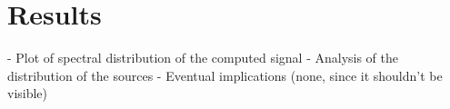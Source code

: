 \chapter{Results}
- Plot of spectral distribution of the computed signal
- Analysis of the distribution of the sources
- Eventual implications (none, since it shouldn't be visible)
